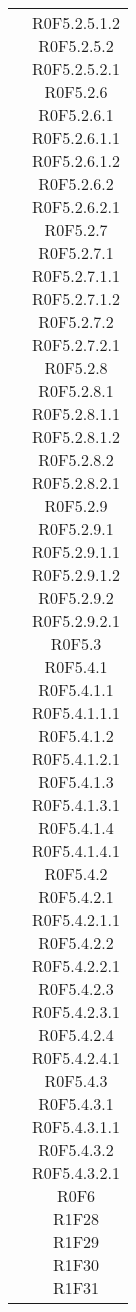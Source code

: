 \begin{center}
\begin{longtable}{|c|c|}
 & \parbox[t]{\dimFonti}{R0F5.2.5.1.2 \\R0F5.2.5.2 \\R0F5.2.5.2.1 \\R0F5.2.6 \\R0F5.2.6.1 \\R0F5.2.6.1.1 \\R0F5.2.6.1.2 \\R0F5.2.6.2 \\R0F5.2.6.2.1 \\R0F5.2.7 \\R0F5.2.7.1 \\R0F5.2.7.1.1 \\R0F5.2.7.1.2 \\R0F5.2.7.2 \\R0F5.2.7.2.1 \\R0F5.2.8 \\R0F5.2.8.1 \\R0F5.2.8.1.1 \\R0F5.2.8.1.2 \\R0F5.2.8.2 \\R0F5.2.8.2.1 \\R0F5.2.9 \\R0F5.2.9.1 \\R0F5.2.9.1.1 \\R0F5.2.9.1.2 \\R0F5.2.9.2 \\R0F5.2.9.2.1 \\R0F5.3 \\R0F5.4.1 \\R0F5.4.1.1 \\R0F5.4.1.1.1 \\R0F5.4.1.2 \\R0F5.4.1.2.1 \\R0F5.4.1.3 \\R0F5.4.1.3.1 \\R0F5.4.1.4 \\R0F5.4.1.4.1 \\R0F5.4.2 \\R0F5.4.2.1 \\R0F5.4.2.1.1 \\R0F5.4.2.2 \\R0F5.4.2.2.1 \\R0F5.4.2.3 \\R0F5.4.2.3.1 \\R0F5.4.2.4 \\R0F5.4.2.4.1 \\R0F5.4.3 \\R0F5.4.3.1 \\R0F5.4.3.1.1 \\R0F5.4.3.2 \\R0F5.4.3.2.1 \\R0F6 \\R1F28 \\R1F29 \\R1F30 \\R1F31 \\}\\  

\end{longtable}
\end{center}
